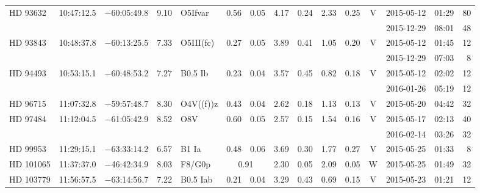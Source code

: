 \begin{tiny}
\begin{longtable}{lrrrll@{$\,\pm$\,}rl@{$\,\pm$\,}rl@{$\,\pm$\,}rcrrr}
HD 93632      &10:47:12.5&  $-$60:05:49.8&        9.10&  O5Ifvar        & 0.56 & 0.05   &    4.17 & 0.24 &      2.33 & 0.25 &    V  &2015-05-12 &01:29&   80\\  %
              &          &               &            &                 & \multicolumn{6}{c}{}                              &       &2015-12-29 &08:01&   48\\  %
HD 93843      &10:48:37.8&  $-$60:13:25.5&        7.33&  O5III(fc)      & 0.27 & 0.05   &    3.89 & 0.41 &      1.05 & 0.20 &    V  &2015-05-12 &01:45&   12\\  %
              &          &               &            &                 & \multicolumn{6}{c}{}                              &       &2015-12-29 &07:03&    8\\  %
HD 94493      &10:53:15.1&  $-$60:48:53.2&        7.27&  B0.5 Ib        & 0.23 & 0.04   &    3.57 & 0.45 &      0.82 & 0.18 &    V  &2015-05-12 &02:02&   12\\  %
              &          &               &            &                 & \multicolumn{6}{c}{}                              &       &2016-01-26 &05:19&   12\\  %
HD 96715      &11:07:32.8&  $-$59:57:48.7&        8.30&  O4V((f))z      & 0.43 & 0.04   &    2.62 & 0.18 &      1.13 & 0.13 &    V  &2015-05-20 &04:42&   32\\  %
HD 97484      &11:12:04.5&  $-$61:05:42.9&        8.52&  O8V            & 0.60 & 0.05   &    2.57 & 0.15 &      1.54 & 0.16 &    V  &2015-05-17 &02:13&   40\\  %
              &          &               &            &                 & \multicolumn{6}{c}{}                              &       &2016-02-14 &03:26&   32\\  %
HD 99953      &11:29:15.1&  $-$63:33:14.2&        6.57&  B1 Ia          & 0.48 & 0.06   &    3.69 & 0.30 &      1.77 & 0.27 &    V  &2015-05-25 &01:33&    8\\  %
HD 101065     &11:37:37.0&  $-$46:42:34.9&        8.03&  F8/G0p&\multicolumn{2}{c}{0.91}&    2.30 & 0.05 &      2.09 & 0.05 &    W  &2015-05-25 &01:49&   32\\  %
HD 103779     &11:56:57.5&  $-$63:14:56.7&        7.22&  B0.5 Iab       & 0.21 & 0.04   &    3.29 & 0.43 &      0.69 & 0.15 &    V  &2015-05-23 &01:21&   12\\  %

\end{longtable}
\end{tiny}

